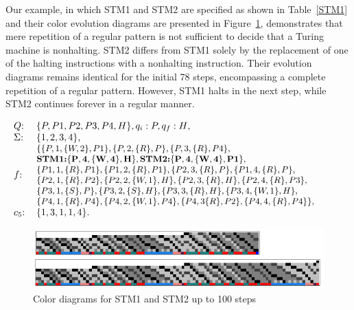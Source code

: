 \documentclass[%
  manuscript=article,   %
  year=2024,
  volume=77,
  doi=00000.000,
]{zfn}
\begin{document}
Our example, in which STM1 and STM2 are specified as shown in Table~\ref{STM1} and their color evolution diagrams are presented in Figure~\ref{STM12}, demonstrates that mere repetition of a regular pattern is not sufficient to decide that a Turing machine is nonhalting. STM2 differs from STM1 solely by the replacement of one of the halting instructions with a nonhalting instruction. Their evolution diagrams remains identical for the initial 78 steps, encompassing a complete repetition of a regular pattern. However, 
STM1 halts in the next step, while STM2 continues forever in a regular manner.

\begin{table}
\begin{eqnarray}
\hspace{-0.5cm}& \begin{tabular}{ll}
$Q$: & $\{P,P1,P2,P3,P4,H\}, q_{i}: P, q_{f}: H$,\\
$\Sigma$: & $\{1,2,3,4\}$,\\
$f$: & \hspace{-0.2cm}\begin{small}\begin{tabular}{l}$\{\{P,1,\{W,2\}, P1\},\{P,2,\{R\},P\},\{P,3,\{R\},P4\},$\\
${\bf \mbox{\bf STM1:} \{P,4,\{W,4\},H\}, \mbox{\bf STM2:} \{P,4,\{W,4\},P1\}}$,\\
$\{P1,1,\{R\},P1\},\{P1,2,\{R\},P1\},\{P2,3,\{R\},P\},\{P1,4,\{R\},P\},$\\
$\{P2,1,\{R\},P2\},\{P2,2,\{W,1\},H\},\{P2,3,\{R\},H\},\{P2,4,\{R\},P3\}$,\\
$\{P3,1,\{S\},P\}, \{P3,2,\{S\},H\}, \{P3,3,\{R\},H\},\{P3,4,\{W,1\},H\},$\\
$\{P4,1,\{R\},P4\},\{P4,2,\{W,1\},P4\}, \{P4,3\{R\},P2\}, \{P4,4,\{R\},P4\}\},$
\end{tabular}\end{small}\\
$c_{5}$: & $\{1,3,1,1,4\}$.
\end{tabular} & \nonumber 
\end{eqnarray}
\caption{STM1 (halting) and STM2 (not halting), differing by one instruction  \label{STM1}}
\end{table}

\begin{figure}
    \centering
    \includegraphics[width=12.5cm]{ART_Lampert/STM12.png}
\caption{Color diagrams for STM1 and STM2 up to 100 steps}
    \label{STM12}
\end{figure}
\end{document}
